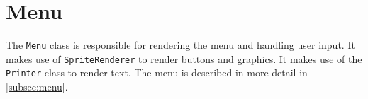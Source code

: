 \section{Menu}
The \texttt{Menu} class is responsible for rendering the menu and handling user input.
It makes use of \texttt{SpriteRenderer} to render buttons and graphics.
It makes use of the \texttt{Printer} class to render text.
The menu is described in more detail in \autoref{subsec:menu}.